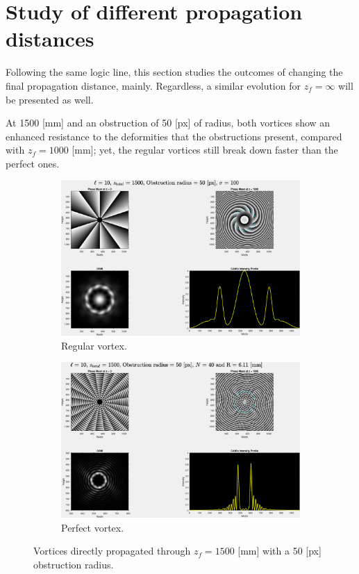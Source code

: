 \section{Study of different propagation distances}
\label{c4:z_f variations}

Following the same logic line, this section studies the outcomes of changing the final propagation distance, mainly. Regardless, a similar evolution for $z_f = \infty$ will be presented as well. 

At 1500 [mm] and an obstruction of 50 [px] of radius, both vortices show an enhanced resistance to the deformities that the obstructions present, compared with $z_f = 1000$ [mm]; yet, the regular vortices still break down faster than the perfect ones.

\begin{figure}[htbp]
    \centering
    \begin{subfigure}[b]{0.45\textwidth}
        \centering
        \includegraphics[width=\textwidth]{images/c04/type=0_r=50_zi=0_zf=1500.eps}
        \caption{Regular vortex.}
    \end{subfigure}
    \hfill
    \begin{subfigure}[b]{0.45\textwidth}
        \centering
        \includegraphics[width=\textwidth]{images/c04/type=1_r=50_zi=0_zf=1500.eps}
        \caption{Perfect vortex.}
    \end{subfigure}
    \caption{Vortices directly propagated through $z_f = 1500$ [mm] with a 50 [px] obstruction radius.}
    \label{fig:Vortices_r=50_z=1500}
\end{figure}

